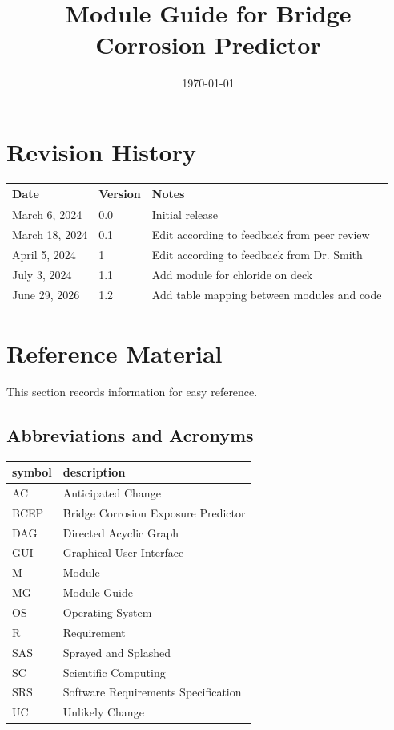 \documentclass[12pt, titlepage]{article}
\begin{document}
\title{Module Guide for Bridge Corrosion Predictor} 
\author{\authname}
\date{\today}

\maketitle


\section{Revision History}

\begin{tabularx}{\textwidth}{p{3cm}p{2cm}X}
\toprule {\bf Date} & {\bf Version} & {\bf Notes}\\
\midrule
March 6, 2024 & 0.0 & Initial release\\
March 18, 2024 & 0.1 & Edit according to feedback from peer review \\
April 5, 2024 & 1 & Edit according to feedback from Dr. Smith\\
July 3, 2024 & 1.1 & Add module for chloride on deck\\
June 29, 2026 & 1.2 & Add table mapping between modules and code\\
\bottomrule
\end{tabularx}

\newpage

\section{Reference Material}

This section records information for easy reference.

\subsection{Abbreviations and Acronyms}

\renewcommand{\arraystretch}{1.2}
\begin{tabular}{l l} 
  \toprule		
  \textbf{symbol} & \textbf{description}\\
  \midrule 
  AC & Anticipated Change\\
  BCEP & Bridge Corrosion Exposure Predictor\\
  DAG & Directed Acyclic Graph \\
  GUI & Graphical User Interface \\
  M & Module \\
  MG & Module Guide \\
  OS & Operating System \\
  R & Requirement\\
  SAS & Sprayed and Splashed \\
  SC & Scientific Computing \\
  SRS & Software Requirements Specification\\
  UC & Unlikely Change \\
  \bottomrule
\end{tabular}\\
\end{document}
